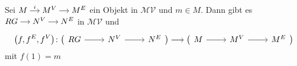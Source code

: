 \begin{lemma}[label=lem:RG_MV]
	Sei \(
		\begin{tikzcd}[cramped,sep=small]
			M \rar["i"] & M^V \rar & M^E
		\end{tikzcd}
	\) ein Objekt in $\mathcal{MV}$ und $m \in M$.
	Dann gibt es \(
		\begin{tikzcd}[cramped,sep=small]
			R G \rar & N^V \rar & N^E
		\end{tikzcd}
	\) in $\mathcal{MV}$ und 
	\[
		\enbrace*{f,f^E, f^V} \colon \big( \begin{tikzcd}
			R G \rar & N^V \rar & N^E
		\end{tikzcd}\big) \longrightarrow \big(\begin{tikzcd}
			M \rar & M^V \rar & M^E
		\end{tikzcd} \big)
	\]
	mit $f(1)=m$
\end{lemma}
